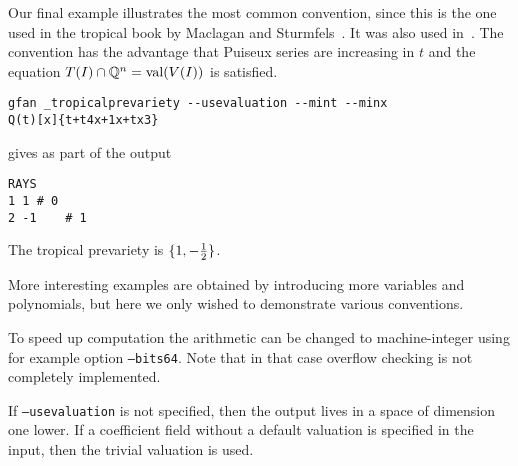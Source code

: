 \begin{example}
Our final example illustrates the most common convention, since this is the one used in the tropical book by Maclagan and Sturmfels~\cite{tropicalbook}. It was also used in~\cite{tropgrass}. The convention has the advantage that Puiseux series are increasing in $t$ and the equation $T(I)\cap\mathbb{Q}^n=\textup{val}(V(I))$ is satisfied.
\begin{verbatim}
gfan _tropicalprevariety --usevaluation --mint --minx
Q(t)[x]{t+t4x+1x+tx3}
\end{verbatim}
gives as part of the output
\begin{verbatim}
RAYS
1 1	# 0
2 -1	# 1
\end{verbatim}
The tropical prevariety is $\{1,-{1\over 2}\}$.
\end{example}
More interesting examples are obtained by introducing more variables and polynomials, but here we only wished to demonstrate various conventions.

To speed up computation the arithmetic can be changed to machine-integer using for example option \texttt{--bits64}. Note that in that case overflow checking is not completely implemented.

If \texttt{--usevaluation} is not specified, then the output lives in a space of dimension one lower. If a coefficient field without a default valuation is specified in the input, then the trivial valuation is used.
